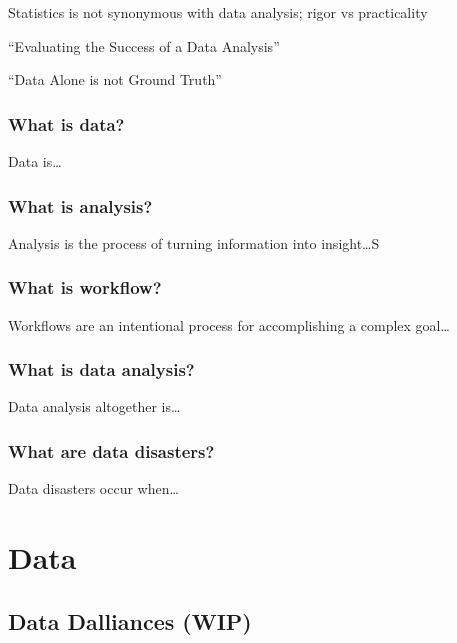 \documentclass[
]{krantz}
\begin{document}
Statistics is not synonymous with data analysis; rigor vs practicality

``Evaluating the Success of a Data Analysis'' \citep{hicks2019evaluating}

``Data Alone is not Ground Truth'' \citep{bassa_2017}

\hypertarget{what-is-data}{%
\section{What is data?}\label{what-is-data}}

Data is\ldots{}

\hypertarget{what-is-analysis}{%
\section{What is analysis?}\label{what-is-analysis}}

Analysis is the process of turning information into insight\ldots S

\hypertarget{what-is-workflow}{%
\section{What is workflow?}\label{what-is-workflow}}

Workflows are an intentional process for accomplishing a complex goal\ldots{}

\hypertarget{what-is-data-analysis}{%
\section{What is data analysis?}\label{what-is-data-analysis}}

Data analysis altogether is\ldots{}

\hypertarget{what-are-data-disasters}{%
\section{What are data disasters?}\label{what-are-data-disasters}}

Data disasters occur when\ldots{}

\hypertarget{part-data}{%
\part*{Data}\label{part-data}}


\hypertarget{data-dall}{%
\chapter{Data Dalliances (WIP)}\label{data-dall}}
\end{document}
